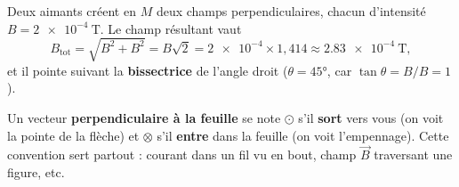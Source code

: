 \documentclass[11pt,a4paper]{article}
\newcommand{\vv}[1]{\vec{#1}}\newcommand{\ds}{\displaystyle}
\begin{document}
\begin{exemplebox}
Deux aimants créent en $M$ deux champs perpendiculaires, chacun d'intensité $B=\qty{2e-4}{\tesla}$.
Le champ résultant vaut
\[ B_{\text{tot}}=\sqrt{B^2+B^2}=B\sqrt{2}=\num{2e-4}\times1{,}414\approx\qty{2.83e-4}{\tesla}, \]
et il pointe suivant la \textbf{bissectrice} de l'angle droit ($\theta=\ang{45}$, car
$\tan\theta=B/B=1$).
\end{exemplebox}

\begin{remarque}
Un vecteur \textbf{perpendiculaire à la feuille} se note $\odot$ s'il \textbf{sort} vers vous
(on voit la pointe de la flèche) et $\otimes$ s'il \textbf{entre} dans la feuille (on voit
l'empennage). Cette convention sert partout : courant dans un fil vu en bout, champ $\vv{B}$
traversant une figure, etc.
\end{remarque}
\end{document}
